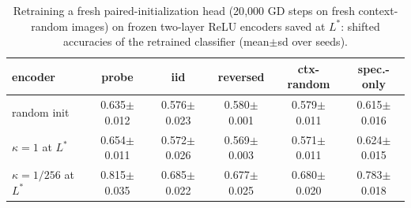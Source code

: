 \begin{table}[htbp]\centering\scriptsize
\caption{Retraining a fresh paired-initialization head (20{,}000 GD steps on fresh context-random images) on frozen two-layer ReLU encoders saved at $L^\ast$: shifted accuracies of the retrained classifier (mean$\pm$sd over seeds).}\label{tab:exp2_nlenc_recovery}
\begin{tabular}{lccccc}\toprule
encoder & probe & iid & reversed & ctx-random & spec.-only \\ \midrule
random init & 0.635$\pm$0.012 & 0.576$\pm$0.023 & 0.580$\pm$0.001 & 0.579$\pm$0.011 & 0.615$\pm$0.016 \\
$\kappa=1$ at $L^\ast$ & 0.654$\pm$0.011 & 0.572$\pm$0.026 & 0.569$\pm$0.003 & 0.571$\pm$0.011 & 0.624$\pm$0.015 \\
$\kappa=1/256$ at $L^\ast$ & 0.815$\pm$0.035 & 0.685$\pm$0.022 & 0.677$\pm$0.025 & 0.680$\pm$0.020 & 0.783$\pm$0.018 \\
\bottomrule\end{tabular}\end{table}
